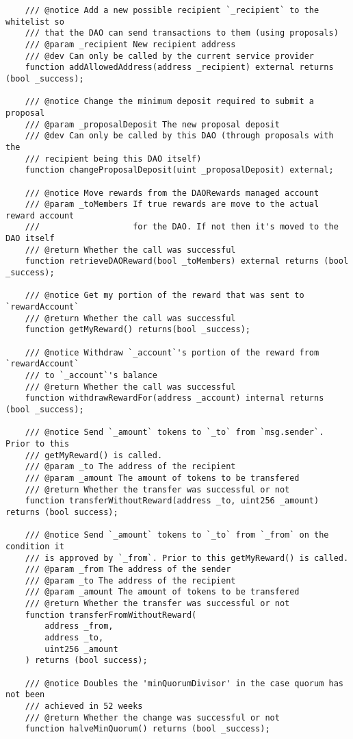 \documentclass[9pt,oneside]{amsart}
\begin{document}
\begin{appendix}
\begin{verbatim}
    /// @notice Add a new possible recipient `_recipient` to the whitelist so
    /// that the DAO can send transactions to them (using proposals)
    /// @param _recipient New recipient address
    /// @dev Can only be called by the current service provider
    function addAllowedAddress(address _recipient) external returns (bool _success);

    /// @notice Change the minimum deposit required to submit a proposal
    /// @param _proposalDeposit The new proposal deposit
    /// @dev Can only be called by this DAO (through proposals with the
    /// recipient being this DAO itself)
    function changeProposalDeposit(uint _proposalDeposit) external;

    /// @notice Move rewards from the DAORewards managed account
    /// @param _toMembers If true rewards are move to the actual reward account
    ///                   for the DAO. If not then it's moved to the DAO itself
    /// @return Whether the call was successful
    function retrieveDAOReward(bool _toMembers) external returns (bool _success);

    /// @notice Get my portion of the reward that was sent to `rewardAccount`
    /// @return Whether the call was successful
    function getMyReward() returns(bool _success);

    /// @notice Withdraw `_account`'s portion of the reward from `rewardAccount`
    /// to `_account`'s balance
    /// @return Whether the call was successful
    function withdrawRewardFor(address _account) internal returns (bool _success);

    /// @notice Send `_amount` tokens to `_to` from `msg.sender`. Prior to this
    /// getMyReward() is called.
    /// @param _to The address of the recipient
    /// @param _amount The amount of tokens to be transfered
    /// @return Whether the transfer was successful or not
    function transferWithoutReward(address _to, uint256 _amount) returns (bool success);

    /// @notice Send `_amount` tokens to `_to` from `_from` on the condition it
    /// is approved by `_from`. Prior to this getMyReward() is called.
    /// @param _from The address of the sender
    /// @param _to The address of the recipient
    /// @param _amount The amount of tokens to be transfered
    /// @return Whether the transfer was successful or not
    function transferFromWithoutReward(
        address _from,
        address _to,
        uint256 _amount
    ) returns (bool success);

    /// @notice Doubles the 'minQuorumDivisor' in the case quorum has not been
    /// achieved in 52 weeks
    /// @return Whether the change was successful or not
    function halveMinQuorum() returns (bool _success);


\end{verbatim}
\end{appendix}
\end{document}
